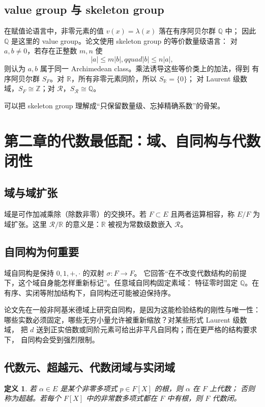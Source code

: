 \documentclass[11pt,a4paper]{article}
\newtheorem{definition}{定义}[section]
\theoremstyle{remark}
\newcommand{\LC}{\mathcal R}
\newcommand{\R}{\mathbb R}
\newcommand{\Q}{\mathbb Q}
\newcommand{\Z}{\mathbb Z}
\begin{document}
\subsection{value group 与 skeleton group}

在赋值论语言中，非零元素的值 $v(x)=\lambda(x)$ 落在有序阿贝尔群 $\Q$ 中；
因此 $\Q$ 是这里的 value group。论文使用 skeleton group 的等价数量级语言：
对 $a,b\ne0$，若存在正整数 $m,n$ 使
\[
|a|\le m|b|,qquad |b|\le n|a|,
\]
则认为 $a,b$ 属于同一 Archimedean class。乘法诱导这些等价类上的加法，得到
有序阿贝尔群 $S_F$。对 $\R$，所有非零元素同阶，所以 $S_{\R}=\{0\}$；
对 Laurent 级数域，$S_F\cong\Z$；对 $\LC$，$S_{\LC}\cong\Q$。

可以把 skeleton group 理解成“只保留数量级、忘掉精确系数”的骨架。

\section{第二章的代数最低配：域、自同构与代数闭性}

\subsection{域与域扩张}

域是可作加减乘除（除数非零）的交换环。若 $F\subset E$ 且两者运算相容，称 $E/F$
为域扩张。这里 $\LC/\R$ 的意义是：$\R$ 被视为常数级数嵌入 $\LC$。

\subsection{自同构为何重要}

域自同构是保持 $0,1,+,\cdot$ 的双射 $\sigma:F\to F$。
它回答“在不改变代数结构的前提下，这个域自身能怎样重新标记”。任意域自同构固定素域：
特征零时固定 $\Q$。在有序、实闭等附加结构下，自同构还可能被迫保持序。

论文先在一般非阿基米德域上研究自同构，是因为这能检验结构的刚性与唯一性：
哪些实数必须固定，哪些无穷小量允许被重新缩放？对某些形式 Laurent 级数域，
把 $d$ 送到正实倍数或同阶元素可给出非平凡自同构；而在更严格的结构要求下，
自同构会受到强烈限制。

\subsection{代数元、超越元、代数闭域与实闭域}

\begin{definition}
若 $\alpha\in E$ 是某个非零多项式 $p\in F[X]$ 的根，则 $\alpha$ 在 $F$ 上代数；
否则称为超越。若每个 $F[X]$ 中的非常数多项式都在 $F$ 中有根，则 $F$ 代数闭。
\end{definition}
\end{document}

